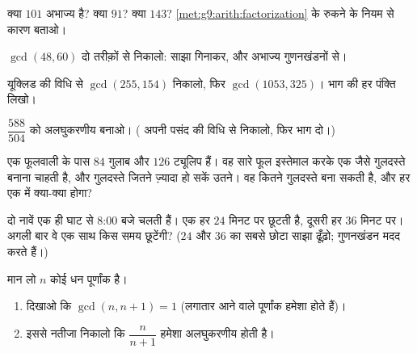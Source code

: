 \begin{exercise}[$\star$]\label{exo:g9:arith:4}
क्या $101$ अभाज्य है? क्या $91$? क्या $143$?
\cref{met:g9:arith:factorization} के रुकने के नियम से कारण बताओ।
\end{exercise}

\begin{exercise}[$\star$]\label{exo:g9:arith:5}
$\gcd(48, 60)$ दो तरीक़ों से निकालो: साझा  गिनाकर, और अभाज्य
गुणनखंडनों से।
\end{exercise}

\begin{exercise}[$\star\star$]\label{exo:g9:arith:6}
यूक्लिड की विधि से $\gcd(255, 154)$ निकालो, फिर $\gcd(1053, 325)$।
भाग की हर पंक्ति लिखो।
\end{exercise}

\begin{exercise}[$\star\star$]\label{exo:g9:arith:7}
 $\dfrac{588}{504}$ को अलघुकरणीय बनाओ। ( अपनी
पसंद की विधि से निकालो, फिर भाग दो।)
\end{exercise}

\begin{exercise}[$\star\star$]\label{exo:g9:arith:8}
एक फूलवाली के पास $84$ गुलाब और $126$ ट्यूलिप हैं। वह सारे फूल
इस्तेमाल करके एक जैसे गुलदस्ते बनाना चाहती है, और गुलदस्ते जितने
ज़्यादा हो सकें उतने। वह कितने गुलदस्ते बना सकती है, और हर एक में
क्या-क्या होगा?
\end{exercise}

\begin{exercise}[$\star\star$]\label{exo:g9:arith:9}
दो नावें एक ही घाट से 8:00 बजे चलती हैं। एक हर $24$ मिनट पर छूटती है,
दूसरी हर $36$ मिनट पर। अगली बार वे एक साथ किस समय छूटेंगी? ($24$ और
$36$ का सबसे छोटा साझा  ढूँढ़ो; गुणनखंडन मदद करते हैं।)
\end{exercise}

\begin{exercise}[$\star\star\star$]\label{exo:g9:arith:10}
मान लो $n$ कोई धन पूर्णांक है।
\begin{enumerate}
  \item दिखाओ कि $\gcd(n, n+1) = 1$ (लगातार आने वाले पूर्णांक हमेशा
         होते हैं)।
  \item इससे नतीजा निकालो कि  $\dfrac{n}{n+1}$ हमेशा अलघुकरणीय
        होती है।
\end{enumerate}
\end{exercise}

